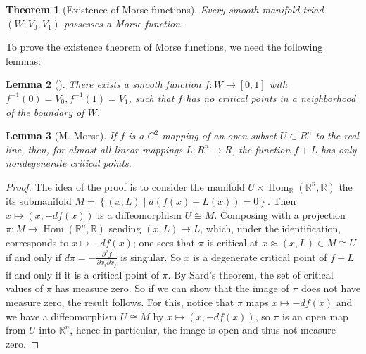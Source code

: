 \documentclass[reqno]{amsart}
\newtheorem{theorem}{Theorem}[section]
\newtheorem{lemma}[theorem]{Lemma}
\theoremstyle{definition}
\theoremstyle{remark}
\DeclareMathOperator{\Hom}{Hom}
\begin{document}
   \begin{theorem}[Existence of
       Morse functions]\label{Existence-of-Morse-functions}
       Every smooth manifold triad
       $\left( W;V_0,V_1 \right) $ possesses
       a Morse function.
   \end{theorem}

   To prove the existence theorem of Morse functions, 
   we need the following lemmas:

   \begin{lemma}[]
       There exists a smooth function
       $f \colon W \to \left[ 0,1 \right] $ with
       $f^{-1}(0) = V_0, f^{-1}(1) = V_1$, such that
       $f$ has no critical points in a neighborhood
       of the boundary of $W$.
   \end{lemma}

   \begin{lemma}[M. Morse]
       If $f$ is a $C^2$ mapping of an open subset
       $U \subset R^{n}$ to the real line, then,
       for almost all linear mappings
       $L \colon R^{n} \to R$, the function
       $f + L$ has only nondegenerate critical
       points.
   \end{lemma}

   \begin{proof}
       The idea of the proof is
       to consider the manifold
       $U \times \Hom_{\mathbb{R}} \left( \mathbb{R}^{n},
       \mathbb{R} \right) $ the its submanifold
       $M = 
       \left\{ \left( x,L \right)  \mid 
       d\left( f(x) + L(x) \right) = 0\right\} $.
       Then $x\mapsto \left( x,-df(x) \right) $ is
       a diffeomorphism $U \cong M$. Composing with
       a projection $\pi \colon M \to \Hom\left( \mathbb{R}^{n},
       \mathbb{R}\right) $ sending
       $\left( x,L \right) \mapsto L$, which,
       under the identification, corresponds to
       $x \mapsto -df(x)$; one sees that
       $\pi$ is critical at $x \approx \left( x,L \right) \in M
       \cong U$ 
       if and only if
       $d\pi = - \frac{\partial^2 f}{\partial x_i 
       \partial x_j}$ is singular.
       So $x$ is a degenerate critical point of $f + L$ 
       if and only if it is a critical point of
       $\pi$. By Sard's theorem, the set of critical
       values of $\pi$ has measure zero. So
       if we can show that the
       image of $\pi$ does not have measure zero, the result follows.
       For this, notice that
       $\pi$ maps $x \mapsto -df(x)$ and we have
       a diffeomorphism
       $U \cong M$ by
       $x \mapsto \left( x, -df(x) \right) $, so
       $\pi$ is an open map from
       $U$ into $\mathbb{R}^{n}$, hence
       in particular, the image is open and thus
       not measure zero.
   \end{proof}
\end{document}
